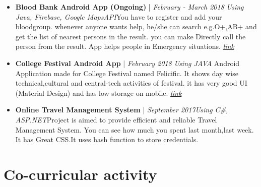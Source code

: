 \documentclass[11pt,a4paper,sans]{moderncv}        %
\begin{document}
\begin{itemize}

\item \textbf{Blood Bank Android App (Ongoing)} | \textit{February - March 2018} \vspace{3pt}\newline\textit{Using Java, Firebase, Google MapsAPI}\vspace{4pt}\newline \small{You have to register and add your bloodgroup. whenever anyone wants help, he/she can search e.g.O+,AB+ and get the list of nearest persons in the result. you can make Directly call the person from the result. App helps people in Emergency situations.} \href{https://github.com/denishrana09/BloodBankApp}{\textit{link}}\vspace{6pt}

\newpage

\item{\textbf{College Festival Android App} | \textit{February 2018} \vspace{3pt}\newline\textit{Using JAVA}
\vspace{4pt}\newline
\small{Android Application made for College Festival named Felicific. It shows day wise technical,cultural and central-tech activities of festival. it has very good UI (Material Design) and has low storage on mobile.}}
\href{https://play.google.com/store/apps/details?id=in.opensol.felicific}{\textit{link}}\vspace{6pt}



\item \textbf{Online Travel Management System} | \textit{September 2017}\vspace{3pt}\newline\textit{Using C\#, ASP.NET}\vspace{4pt}\newline \small{Project is aimed to provide efficient and reliable Travel Management System. You can see how much you spent last month,last week. It has Great CSS.It uses hash function to store credentials.} 
\end{itemize}






\section{Co-curricular activity}
\end{document}
